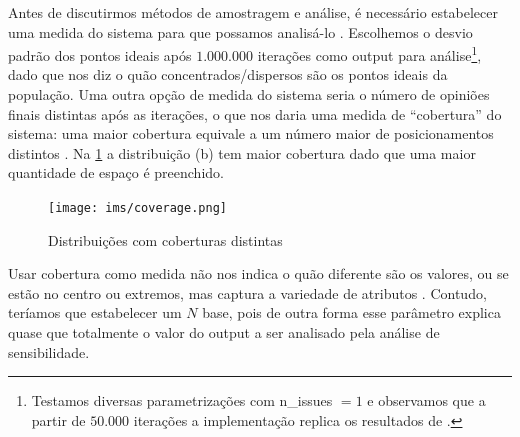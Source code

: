     Antes de discutirmos métodos de amostragem e análise, é necessário
    estabelecer uma medida do sistema para que possamos analisá-lo
    \cite{railsback2012agent}. Escolhemos o desvio padrão dos pontos ideais após
    \(1.000.000\) iterações como output para análise\footnote{Testamos diversas
      parametrizações com n\_issues \(= 1\) e observamos que a partir de
      \(50.000\) iterações a implementação replica os resultados de
      .}, dado que nos diz o quão
    concentrados/dispersos são os pontos ideais da população. Uma outra opção de
    medida do sistema seria o número de opiniões finais distintas após as
    iterações, o que nos daria uma medida de ``cobertura'' do sistema: uma maior
    cobertura equivale a um número maior de posicionamentos distintos
    \cite{bramson2016disambiguation}. Na \ref{fig:coverage} a distribuição (b)
    tem maior cobertura dado que uma maior quantidade de espaço é preenchido.
    
    \begin{figure}[H]
      \centering
      \texttt{[image: ims/coverage.png]}
      \caption{Distribuições com coberturas distintas}
      \label{fig:coverage}
    \end{figure}

    
    Usar cobertura como medida não nos indica
    o quão diferente são os valores, ou se estão no centro ou extremos, mas
    captura a variedade de atributos \cite[p.85]{bramson2016disambiguation}.
    Contudo, teríamos que estabelecer um \(N\) base, pois de outra forma esse
    parâmetro explica quase que totalmente o valor do output a ser analisado
    pela análise de sensibilidade.
    
